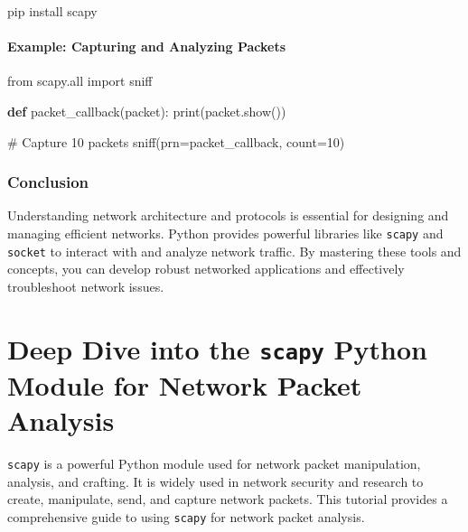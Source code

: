 \documentclass[
  letterpaper,
  DIV=11,
  numbers=noendperiod]{scrreprt}
\newenvironment{Shaded}{\begin{snugshade}}{\end{snugshade}}
\newcommand{\BuiltInTok}[1]{\textcolor[rgb]{0.00,0.23,0.31}{#1}}
\newcommand{\CommentTok}[1]{\textcolor[rgb]{0.37,0.37,0.37}{#1}}
\newcommand{\DecValTok}[1]{\textcolor[rgb]{0.68,0.00,0.00}{#1}}
\newcommand{\ExtensionTok}[1]{\textcolor[rgb]{0.00,0.23,0.31}{#1}}
\newcommand{\ImportTok}[1]{\textcolor[rgb]{0.00,0.46,0.62}{#1}}
\newcommand{\KeywordTok}[1]{\textcolor[rgb]{0.00,0.23,0.31}{\textbf{#1}}}
\newcommand{\NormalTok}[1]{\textcolor[rgb]{0.00,0.23,0.31}{#1}}
\newcommand{\OperatorTok}[1]{\textcolor[rgb]{0.37,0.37,0.37}{#1}}
\begin{document}
\begin{Shaded}
\begin{Highlighting}[]
\ExtensionTok{pip}\NormalTok{ install scapy}
\end{Highlighting}
\end{Shaded}

\subsubsection{Example: Capturing and Analyzing
Packets}\label{example-capturing-and-analyzing-packets}

\begin{Shaded}
\begin{Highlighting}[]
\ImportTok{from}\NormalTok{ scapy.}\BuiltInTok{all} \ImportTok{import}\NormalTok{ sniff}

\KeywordTok{def}\NormalTok{ packet\_callback(packet):}
    \BuiltInTok{print}\NormalTok{(packet.show())}

\CommentTok{\# Capture 10 packets}
\NormalTok{sniff(prn}\OperatorTok{=}\NormalTok{packet\_callback, count}\OperatorTok{=}\DecValTok{10}\NormalTok{)}
\end{Highlighting}
\end{Shaded}

\subsection{Conclusion}\label{conclusion-32}

Understanding network architecture and protocols is essential for
designing and managing efficient networks. Python provides powerful
libraries like \texttt{scapy} and \texttt{socket} to interact with and
analyze network traffic. By mastering these tools and concepts, you can
develop robust networked applications and effectively troubleshoot
network issues.


\chapter{\texorpdfstring{Deep Dive into the \texttt{scapy} Python Module
for Network Packet
Analysis}{Deep Dive into the scapy Python Module for Network Packet Analysis}}\label{deep-dive-into-the-scapy-python-module-for-network-packet-analysis}

\texttt{scapy} is a powerful Python module used for network packet
manipulation, analysis, and crafting. It is widely used in network
security and research to create, manipulate, send, and capture network
packets. This tutorial provides a comprehensive guide to using
\texttt{scapy} for network packet analysis.
\end{document}
